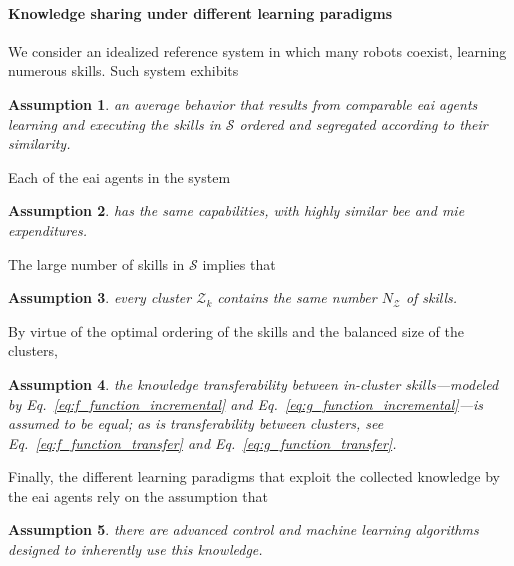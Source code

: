 \documentclass[12pt]{article}
\newtheorem{assumption}{Assumption}
\begin{document}
\paragraph*{Knowledge sharing under different learning paradigms}
We consider an idealized reference system in which many robots coexist, learning numerous skills. Such system exhibits
\begin{tcolorbox}
	\begin{assumption}\label{assumption:average_behavior}
		an average behavior that results from comparable \ac{eai} agents learning and executing the skills in $\mathcal{S}$ ordered and segregated according to their similarity.
	\end{assumption}
\end{tcolorbox}
\noindent Each of the \ac{eai} agents in the system
\begin{tcolorbox}
	\begin{assumption}\label{assumption:agent_similarity}
		has the same capabilities, with highly similar \ac{bee} and \ac{mie} expenditures.
	\end{assumption}
\end{tcolorbox}
\noindent The large number of skills in $\mathcal{S}$ implies that
\begin{tcolorbox}
	\begin{assumption}\label{assumption:cluster_size}
		every cluster $\mathcal{Z}_{k}$ contains the same number $N_{\mathcal{Z}} $ of skills.
	\end{assumption}
\end{tcolorbox}
\noindent By virtue of the optimal ordering of the skills and the balanced size of the clusters,
\begin{tcolorbox}
	\begin{assumption}\label{assumption:cluster_transferability}
		the knowledge transferability between in-cluster skills---modeled by Eq.~\eqref{eq:f_function_incremental} and Eq.~\eqref{eq:g_function_incremental}---is assumed to be equal; as is transferability between clusters, see Eq.~\eqref{eq:f_function_transfer} and Eq.~\eqref{eq:g_function_transfer}.
	\end{assumption}
\end{tcolorbox}
\noindent Finally, the different learning paradigms that exploit the collected knowledge by the \ac{eai} agents rely on the assumption that
\begin{tcolorbox}
	\begin{assumption}\label{assumption:enabling_agorithms}
		there are advanced control and machine learning algorithms designed to inherently use this knowledge.
	\end{assumption}
\end{tcolorbox}
\end{document}
